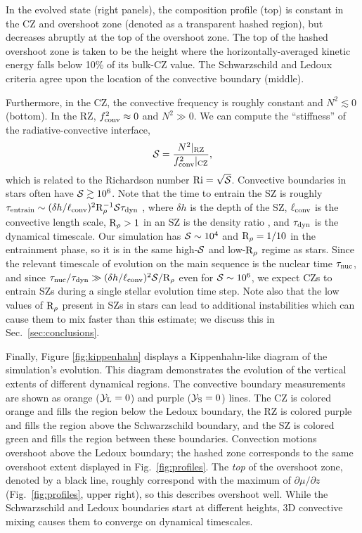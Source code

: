 In the evolved state (right panels), the composition profile (top) is constant in the CZ and overshoot zone (denoted as a transparent hashed region), but decreases abruptly at the top of the overshoot zone.
The top of the hashed overshoot zone is taken to be the height where the horizontally-averaged kinetic energy falls below 10\% of its bulk-CZ value.
The Schwarzschild and Ledoux criteria agree upon the location of the convective boundary (middle).

Furthermore, in the CZ, the convective frequency is roughly constant and $N^2 \lesssim 0$ (bottom).
In the RZ, $f_{\rm{conv}}^2 \approx 0$ and $N^2 \gg 0$.
We can compute the ``stiffness'' of the radiative-convective interface,
\begin{equation}
\mS = \frac{N^2|_{\rm{RZ}}}{f_{\rm{conv}}^2|_{\rm{CZ}}},
\label{eqn:stiffness}
\end{equation}
which is related to the Richardson number $\rm{Ri} = \sqrt{\mathcal{S}}$.
Convective boundaries in stars often have $\mathcal{S} \gtrsim 10^6$.
Note that the time to entrain the SZ is roughly $\tau_{\rm{entrain}} \sim (\delta h / \ell_{\rm{conv}})^2 \rm{R}_{\rho}^{-1} \mathcal{S} \tau_{\rm{dyn}}$ \citep[per][eqn.~3]{fuentes_cumming_2020}, where $\delta h$ is the depth of the SZ, $\ell_{\rm{conv}}$ is the convective length scale, $\rm{R}_{\rho} > 1$ in an SZ is the density ratio \citep[see][eqn.~7]{garaud_2018}, and $\tau_{\rm{dyn}}$ is the dynamical timescale.
Our simulation has $\mathcal{S} \sim 10^{4}$ and $\rm{R}_\rho = 1/10$ in the entrainment phase, so it is in the same high-$\mathcal{S}$ and low-$\rm{R}_\rho$ regime as stars.
Since the relevant timescale of evolution on the main sequence is the nuclear time $\tau_{\rm{nuc}}$, and since $\tau_{\rm{nuc}}/\tau_{\rm{dyn}} \gg (\delta h/\ell_{\rm{conv}})^2 \mathcal{S}/\mathrm{R}_{\rho}$ even for $\mathcal{S} \sim 10^6$, we expect CZs to entrain SZs during a single stellar evolution time step.
Note also that the low values of $\mathrm{R}_{\rho}$ present in SZs in stars can lead to additional instabilities which can cause them to mix faster than this estimate; we discuss this in Sec.~\ref{sec:conclusions}.

Finally, Figure \ref{fig:kippenhahn} displays a Kippenhahn-like diagram of the simulation's evolution.
This diagram demonstrates the evolution of the vertical extents of different dynamical regions.
The convective boundary measurements are shown as orange ($\mathcal{Y}_{\rm{L}} = 0$) and purple ($\mathcal{Y}_{\rm{S}} = 0$) lines.
The CZ is colored orange and fills the region below the Ledoux boundary, the RZ is colored purple and fills the region above the Schwarzschild boundary, and the SZ is colored green and fills the region between these boundaries.
Convection motions overshoot above the Ledoux boundary; the hashed zone corresponds to the same overshoot extent displayed in Fig.~\ref{fig:profiles}.
The \emph{top} of the overshoot zone, denoted by a black line, roughly correspond with the maximum of $\partial\mu/\partial z$ (Fig.~\ref{fig:profiles}, upper right), so this describes overshoot well.
While the Schwarzschild and Ledoux boundaries start at different heights, 3D convective mixing causes them to converge on dynamical timescales.


